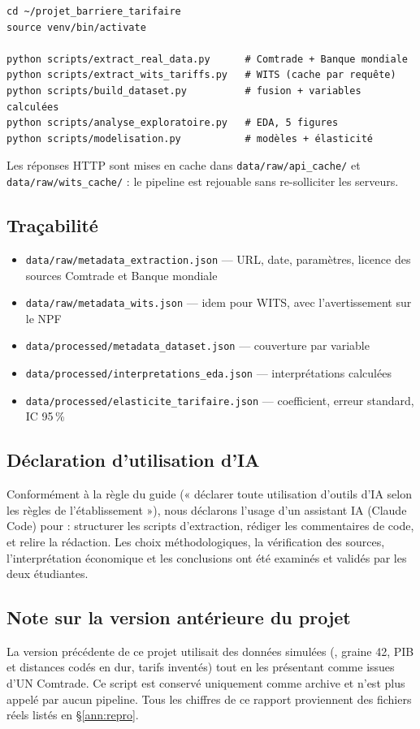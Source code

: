 \documentclass[11pt,a4paper]{article}
\begin{document}
\begin{verbatim}
cd ~/projet_barriere_tarifaire
source venv/bin/activate

python scripts/extract_real_data.py      # Comtrade + Banque mondiale
python scripts/extract_wits_tariffs.py   # WITS (cache par requête)
python scripts/build_dataset.py          # fusion + variables calculées
python scripts/analyse_exploratoire.py   # EDA, 5 figures
python scripts/modelisation.py           # modèles + élasticité
\end{verbatim}

Les réponses HTTP sont mises en cache dans \texttt{data/raw/api\_cache/} et
\texttt{data/raw/wits\_cache/} : le pipeline est rejouable sans re-solliciter les
serveurs.

\subsection{Traçabilité}

\begin{itemize}[leftmargin=1.2cm]
    \item \texttt{data/raw/metadata\_extraction.json} — URL, date, paramètres, licence
          des sources Comtrade et Banque mondiale
    \item \texttt{data/raw/metadata\_wits.json} — idem pour WITS, avec l'avertissement
          sur le NPF
    \item \texttt{data/processed/metadata\_dataset.json} — couverture par variable
    \item \texttt{data/processed/interpretations\_eda.json} — interprétations calculées
    \item \texttt{data/processed/elasticite\_tarifaire.json} — coefficient, erreur
          standard, IC 95\,\%
\end{itemize}

\subsection{Déclaration d'utilisation d'IA}

Conformément à la règle du guide (« déclarer toute utilisation d'outils d'IA selon
les règles de l'établissement »), nous déclarons l'usage d'un assistant IA
(Claude Code) pour : structurer les scripts d'extraction, rédiger les commentaires de
code, et relire la rédaction. Les choix méthodologiques, la vérification des sources,
l'interprétation économique et les conclusions ont été examinés et validés par les
deux étudiantes.

\subsection{Note sur la version antérieure du projet}

La version précédente de ce projet utilisait des données simulées
(, graine 42, PIB et distances
codés en dur, tarifs inventés) tout en les présentant comme issues d'UN Comtrade. Ce
script est conservé uniquement comme archive et n'est plus appelé par aucun pipeline.
Tous les chiffres de ce rapport proviennent des fichiers réels listés en
\S\ref{ann:repro}.
\end{document}
